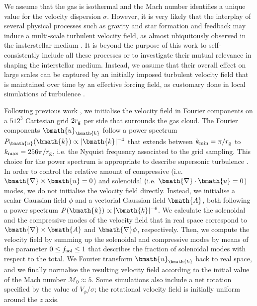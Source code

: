 \documentclass[a4paper,fleqn,usenatbib]{mnras}
\begin{document}
We assume that the gas is isothermal and the Mach number identifies a unique value for the velocity dispersion $\sigma$.
However, it is very likely that the interplay of several physical processes such as gravity and star formation and feedback may induce a multi-scale turbulent velocity field, as almost ubiquitously observed in the insterstellar medium \citep{hennebelle+12,falceta+14}.
It is beyond the purpose of this work to self-consistently include all these processes or to investigate their mutual relevance in shaping the interstellar medium.
Instead, we assume that their overall effect on large scales can be captured by an initially imposed turbulent velocity field that is maintained over time by an effective forcing field, as customary done in local simulations of turbulence \citep{schmidt+06, bauer+12,konstandin+12, federrath+13}.  

Following previous work \citep{hobbs+11, mapelli+12}, we initialise the velocity field in Fourier components on a $512^3$ Cartesian grid $2 r_{\rm g}$ per side that surrounds the gas cloud.
The Fourier components $\bmath{u}_{\bmath{k}}$ follow a power spectrum $P_{\bmath{u}}(\bmath{k}) \propto |\bmath{k}|^{-4}$ that extends between $k_{\rm min} = \pi/r_{\rm g}$ to $k_{\rm max} = 256 \pi /r_{\rm g}$, i.e. the Nyquist frequency associated to the grid sampling.
This choice for the power spectrum is appropriate to describe supersonic turbulence \citep{federrath+13}.
In order to control the relative amount of compressive (i.e. $\bmath{\nabla} \times \bmath{u} = 0$) and solenoidal (i.e. $\bmath{\nabla} \cdot \bmath{u} = 0$) modes, we do not initialise the velocity field directly.
Instead, we initialise a scalar Gaussian field $\phi$ and a vectorial Gaussian field $\bmath{A}$, both following a power spectrum $P(\bmath{k}) \propto |\bmath{k}|^{-6}$.
We calculate the solenoidal and the compressive modes of the velocity field that in real space correspond to $\bmath{\nabla} \times \bmath{A}$ and $\bmath{\nabla}\phi$, respectively.
Then, we compute the velocity field by summing up the solenoidal and compressive modes by means of the parameter $0 \leq f_{\rm sol} \leq 1$ that describes the fraction of solenoidal modes with respect to the total.
We Fourier transform $\bmath{u}_{\bmath{k}}$ back to real space, and we finally normalise the resulting velocity field according to the initial value of the Mach number $\mathcal{M}_{0} \approx 5$.
Some simulations also include a net rotation specified by the value of $V_{\phi}/\sigma$; the rotational velocity field is initially uniform around the $z$ axis. 
\end{document}
